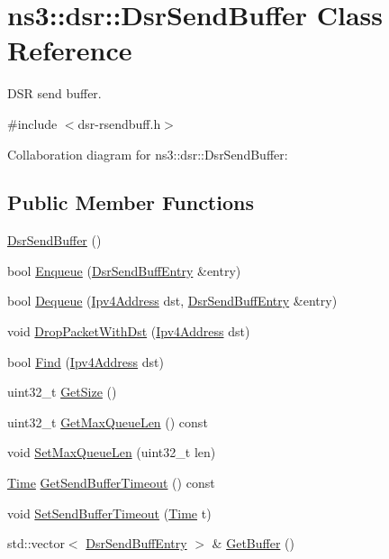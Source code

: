 \hypertarget{classns3_1_1dsr_1_1DsrSendBuffer}{}\section{ns3\+:\+:dsr\+:\+:Dsr\+Send\+Buffer Class Reference}
\label{classns3_1_1dsr_1_1DsrSendBuffer}


D\+SR send buffer.  




{\ttfamily \#include $<$dsr-\/rsendbuff.\+h$>$}



Collaboration diagram for ns3\+:\+:dsr\+:\+:Dsr\+Send\+Buffer\+:
\subsection*{Public Member Functions}
\begin{DoxyCompactItemize}
\item 
\hyperlink{classns3_1_1dsr_1_1DsrSendBuffer_af2f4882bbeff675ff66b2e72d5f6c451}{Dsr\+Send\+Buffer} ()
\item 
bool \hyperlink{classns3_1_1dsr_1_1DsrSendBuffer_aac846f6a38f6fc6431c8483103ed5121}{Enqueue} (\hyperlink{classns3_1_1dsr_1_1DsrSendBuffEntry}{Dsr\+Send\+Buff\+Entry} \&entry)
\item 
bool \hyperlink{classns3_1_1dsr_1_1DsrSendBuffer_a31b49398ddb6a97b6ef27daa0d4ff6d7}{Dequeue} (\hyperlink{classns3_1_1Ipv4Address}{Ipv4\+Address} dst, \hyperlink{classns3_1_1dsr_1_1DsrSendBuffEntry}{Dsr\+Send\+Buff\+Entry} \&entry)
\item 
void \hyperlink{classns3_1_1dsr_1_1DsrSendBuffer_af20f9ff303a1099f3568254d4c58e829}{Drop\+Packet\+With\+Dst} (\hyperlink{classns3_1_1Ipv4Address}{Ipv4\+Address} dst)
\item 
bool \hyperlink{classns3_1_1dsr_1_1DsrSendBuffer_acf27d9e92a1d1960b9094c4108724a53}{Find} (\hyperlink{classns3_1_1Ipv4Address}{Ipv4\+Address} dst)
\item 
uint32\+\_\+t \hyperlink{classns3_1_1dsr_1_1DsrSendBuffer_a0ecf75786eef7193fa5a5d84b2b7a1f0}{Get\+Size} ()
\item 
uint32\+\_\+t \hyperlink{classns3_1_1dsr_1_1DsrSendBuffer_a34ad8ca421a6ba506b3b76bcf0bfb2ea}{Get\+Max\+Queue\+Len} () const 
\item 
void \hyperlink{classns3_1_1dsr_1_1DsrSendBuffer_a01d2c15d2f020c8f46b628426a98450f}{Set\+Max\+Queue\+Len} (uint32\+\_\+t len)
\item 
\hyperlink{classns3_1_1Time}{Time} \hyperlink{classns3_1_1dsr_1_1DsrSendBuffer_a72dfd7d7334d0f6ca0064ce807f9a938}{Get\+Send\+Buffer\+Timeout} () const 
\item 
void \hyperlink{classns3_1_1dsr_1_1DsrSendBuffer_a3b036f56c257571ae3fa5b5a49b2a57b}{Set\+Send\+Buffer\+Timeout} (\hyperlink{classns3_1_1Time}{Time} t)
\item 
std\+::vector$<$ \hyperlink{classns3_1_1dsr_1_1DsrSendBuffEntry}{Dsr\+Send\+Buff\+Entry} $>$ \& \hyperlink{classns3_1_1dsr_1_1DsrSendBuffer_ad21223587fd6ae3a42b124416e877305}{Get\+Buffer} ()
\end{DoxyCompactItemize}
